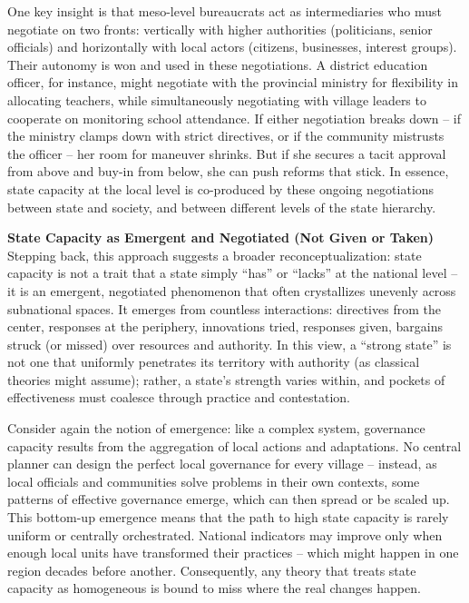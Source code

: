 One key insight is that meso-level bureaucrats act as intermediaries who must negotiate on two fronts:
vertically with higher authorities (politicians, senior officials) and horizontally with local actors
(citizens, businesses, interest groups). Their autonomy is won and used in these negotiations. A district
education officer, for instance, might negotiate with the provincial ministry for flexibility in allocating
teachers, while simultaneously negotiating with village leaders to cooperate on monitoring school
attendance. If either negotiation breaks down – if the ministry clamps down with strict directives, or if
the community mistrusts the officer – her room for maneuver shrinks. But if she secures a tacit approval
from above and buy-in from below, she can push reforms that stick. In essence, state capacity at the
local level is co-produced by these ongoing negotiations between state and society, and between
different levels of the state hierarchy.

\textbf{State Capacity as Emergent and Negotiated (Not Given or Taken)
}Stepping back, this approach suggests a broader reconceptualization: state capacity is not a trait that a
state simply “has” or “lacks” at the national level – it is an emergent, negotiated phenomenon that often
crystallizes unevenly across subnational spaces. It emerges from countless interactions: directives from
the center, responses at the periphery, innovations tried, responses given, bargains struck (or missed)
over resources and authority. In this view, a “strong state” is not one that uniformly penetrates its
territory with authority (as classical theories might assume); rather, a state’s strength varies within, and
pockets of effectiveness must coalesce through practice and contestation.

Consider again the notion of emergence: like a complex system, governance capacity results from the
aggregation of local actions and adaptations. No central planner can design the perfect local governance
for every village – instead, as local officials and communities solve problems in their own contexts,
some patterns of effective governance emerge, which can then spread or be scaled up. This bottom-up
emergence means that the path to high state capacity is rarely uniform or centrally orchestrated. National
indicators may improve only when enough local units have transformed their practices – which might
happen in one region decades before another. Consequently, any theory that treats state capacity as
homogeneous is bound to miss where the real changes happen.

